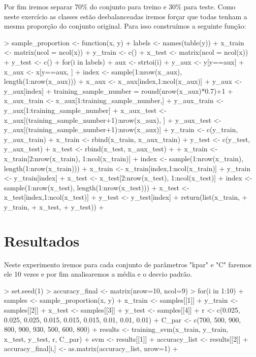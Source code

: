 \documentclass[12pt]{article}
\begin{document}
  \par Por fim iremos separar 70\%  do conjunto para treino e 30\% para teste. Como neste exercício as classes estão desbalanceadas iremos forçar que todas tenham a mesma proporção do conjunto original. Para isso construímos a seguinte função:
\begin{Schunk}
\begin{Sinput}
> sample_proportion <- function(x, y){
+   labels <- names(table(y))
+   x_train <- matrix(ncol = ncol(x))
+   y_train <- c()
+   x_test <- matrix(ncol = ncol(x))
+   y_test <- c()
+   for(i in labels){
+     aux <- strtoi(i)
+     y_aux <- y[y==aux]
+     x_aux <- x[y==aux, ]
+     index <- sample(1:nrow(x_aux), length(1:nrow(x_aux)))
+     x_aux <- x_aux[index,1:ncol(x_aux)]
+     y_aux <- y_aux[index]
+     training_sample_number = round(nrow(x_aux)*0.7)+1
+     x_aux_train <- x_aux[1:training_sample_number,]
+     y_aux_train <- y_aux[1:training_sample_number]
+     x_aux_test <- x_aux[(training_sample_number+1):nrow(x_aux), ]
+     y_aux_test <- y_aux[(training_sample_number+1):nrow(x_aux)]
+     y_train <- c(y_train, y_aux_train)
+     x_train <- rbind(x_train, x_aux_train)
+     y_test <- c(y_test, y_aux_test)
+     x_test <- rbind(x_test, x_aux_test)
+   }
+   x_train <- x_train[2:nrow(x_train), 1:ncol(x_train)]
+   index <- sample(1:nrow(x_train), length(1:nrow(x_train)))
+   x_train <- x_train[index,1:ncol(x_train)]
+   y_train <- y_train[index]
+   x_test <- x_test[2:nrow(x_test), 1:ncol(x_test)]
+   index <- sample(1:nrow(x_test), length(1:nrow(x_test)))
+   x_test <- x_test[index,1:ncol(x_test)]
+   y_test <- y_test[index]
+   return(list(x_train,
+               y_train,
+               x_test,
+               y_test))
+ }
\end{Sinput}
\end{Schunk}


\section{Resultados}
  
  \par Neste experimento iremos para cada conjunto de parâmetros "kpar" e "C" faremos ele 10 vezes e por fim analisaremos a média e o desvio padrão.
  
\begin{Schunk}
\begin{Sinput}
> set.seed(1)
> accuracy_final <- matrix(nrow=10, ncol=9)
> for(i in 1:10){
+   samples <- sample_proportion(x, y)
+   x_train <- samples[[1]]
+   y_train <- samples[[2]]
+   x_test <- samples[[3]]
+   y_test <- samples[[4]]
+   r <- c(0.025, 0.025, 0.025, 0.015, 0.015, 0.015, 0.01, 0.01, 0.01)
+   C_par <- c(700, 500, 900, 800, 900, 930, 500, 600, 800)
+   results <- training_svm(x_train, y_train, x_test, y_test, r, C_par)
+   svm <- results[[1]]
+   accuracy_list <- results[[2]]
+   accuracy_final[i,] <- as.matrix(accuracy_list, nrow=1)
+ }
\end{Sinput}
\end{Schunk}
\end{document}
